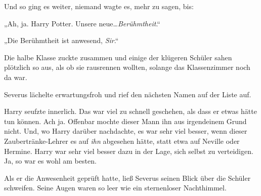 Und so ging es weiter, niemand wagte es, mehr zu sagen, bis:

„Ah, ja. Harry Potter. Unsere neue…\emph{Berühmtheit}.“

„Die Berühmtheit ist anwesend, \emph{Sir}.“

Die halbe Klasse zuckte zusammen und einige der klügeren Schüler sahen plötzlich so aus, als ob sie rausrennen wollten, solange das Klassenzimmer noch da war.

Severus lächelte erwartungsfroh und rief den nächsten Namen auf der Liste auf.

Harry seufzte innerlich. Das war viel zu schnell geschehen, als dass er etwas hätte tun können. Ach ja. Offenbar mochte dieser Mann ihn aus irgendeinem Grund nicht. Und, wo Harry darüber nachdachte, es war sehr viel besser, wenn dieser Zaubertränke-Lehrer es auf \emph{ihn} abgesehen hätte, statt etwa auf Neville oder Hermine. Harry war sehr viel besser dazu in der Lage, sich selbst zu verteidigen. Ja, so war es wohl am besten.

Als er die Anwesenheit geprüft hatte, ließ Severus seinen Blick über die Schüler schweifen. Seine Augen waren so leer wie ein sternenloser Nachthimmel.

